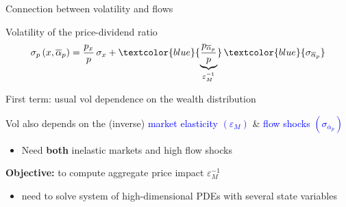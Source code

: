 \begin{frame}{Connection between volatility and flows}
	\begin{wideitemize}
		\item Volatility of the price-dividend ratio
		\[\sigma_{p}\left(x, \overline{\alpha}_{p}\right)=\frac{p_{x}}{p}\, \sigma_{x}+\textcolor{blue}{\underbrace{\frac{p_{\overline{\alpha}_{p}}}{p}}_{\varepsilon_M^{-1}}}\, \textcolor{blue}{\sigma_{\overline{\alpha}_{p}}}\]
		\item First term: usual vol dependence on the wealth distribution
		\item Vol also depends on the (inverse) \textcolor{blue}{market elasticity $ (\varepsilon_M) $} \& \textcolor{blue}{flow shocks $ (\sigma_{\overline{\alpha}_p}) $}\vspM
		\begin{itemize}
			\item Need \textbf{both} inelastic markets and high flow shocks%
		\end{itemize}
		\item \textbf{Objective:} to compute aggregate price impact $ \varepsilon_M^{-1} $\vspM%
		\begin{itemize}
			\item  need to solve system of high-dimensional PDEs with several state variables 
		\end{itemize}
	\end{wideitemize}
\end{frame}


%

